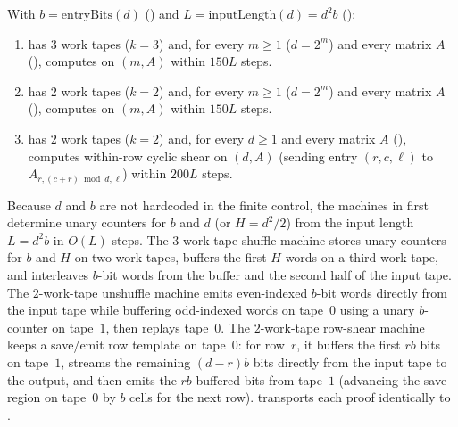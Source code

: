 \begin{proposition}\label{prop:stone-tm}
With $b = \mathrm{entryBits}(d)$ () and
$L = \mathrm{inputLength}(d) = d^2 b$ ():
\begin{enumerate}[label=(\alph*)]
\item {} has $3$ work tapes ($k = 3$) and, for every $m \ge 1$ ($d = 2^m$)
  and every matrix $A$ (), computes  on $(m, A)$
  within $150 L$ steps.
\item {} has $2$ work tapes ($k = 2$) and, for every $m \ge 1$ ($d = 2^m$)
  and every matrix $A$ (), computes  on $(m, A)$
  within $150 L$ steps.
\item {} has $2$ work tapes ($k = 2$) and, for every $d \ge 1$ and every matrix
  $A$ (), computes within-row cyclic shear  on
  $(d, A)$ (sending entry $(r, c, \ell)$ to $A_{r, (c+r)\bmod d, \ell}$) within $200 L$ steps.
\end{enumerate}
\end{proposition}
\begin{outline}
Because $d$ and $b$ are not hardcoded in the finite control, the machines in
 first determine unary counters for $b$ and $d$ (or $H = d^2/2$)
from the input length $L = d^2 b$ in $O(L)$ steps. The $3$-work-tape shuffle machine stores unary
counters for $b$ and $H$ on two work tapes, buffers the first $H$ words on a third work tape, and
interleaves $b$-bit words from the buffer and the second half of the input tape. The $2$-work-tape
unshuffle machine emits even-indexed $b$-bit words directly from the input tape while buffering
odd-indexed words on tape~$0$ using a unary $b$-counter on tape~$1$, then replays tape~$0$. The
$2$-work-tape row-shear machine keeps a save/emit row template on tape~$0$: for row~$r$, it buffers
the first $rb$ bits on tape~$1$, streams the remaining $(d - r)b$ bits directly from the input tape
to the output, and then emits the $rb$ buffered bits from tape~$1$ (advancing the save region on
tape~$0$ by $b$ cells for the next row).  transports each proof
identically to
.
\end{outline}

